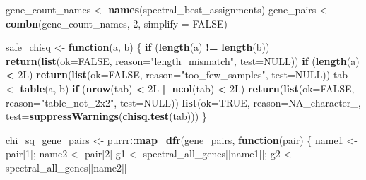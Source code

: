 \documentclass[
]{article}
\newenvironment{Shaded}{\begin{snugshade}}{\end{snugshade}}
\newcommand{\AttributeTok}[1]{\textcolor[rgb]{0.13,0.29,0.53}{#1}}
\newcommand{\ConstantTok}[1]{\textcolor[rgb]{0.56,0.35,0.01}{#1}}
\newcommand{\ControlFlowTok}[1]{\textcolor[rgb]{0.13,0.29,0.53}{\textbf{#1}}}
\newcommand{\DataTypeTok}[1]{\textcolor[rgb]{0.13,0.29,0.53}{#1}}
\newcommand{\DecValTok}[1]{\textcolor[rgb]{0.00,0.00,0.81}{#1}}
\newcommand{\FunctionTok}[1]{\textcolor[rgb]{0.13,0.29,0.53}{\textbf{#1}}}
\newcommand{\NormalTok}[1]{#1}
\newcommand{\OtherTok}[1]{\textcolor[rgb]{0.56,0.35,0.01}{#1}}
\newcommand{\SpecialCharTok}[1]{\textcolor[rgb]{0.81,0.36,0.00}{\textbf{#1}}}
\newcommand{\StringTok}[1]{\textcolor[rgb]{0.31,0.60,0.02}{#1}}
\begin{document}
\begin{Shaded}
\begin{Highlighting}[]
\NormalTok{gene\_count\_names }\OtherTok{\textless{}{-}} \FunctionTok{names}\NormalTok{(spectral\_best\_assignments)}
\NormalTok{gene\_pairs }\OtherTok{\textless{}{-}} \FunctionTok{combn}\NormalTok{(gene\_count\_names, }\DecValTok{2}\NormalTok{, }\AttributeTok{simplify =} \ConstantTok{FALSE}\NormalTok{)}

\NormalTok{safe\_chisq }\OtherTok{\textless{}{-}} \ControlFlowTok{function}\NormalTok{(a, b) \{}
  \ControlFlowTok{if}\NormalTok{ (}\FunctionTok{length}\NormalTok{(a) }\SpecialCharTok{!=} \FunctionTok{length}\NormalTok{(b)) }\FunctionTok{return}\NormalTok{(}\FunctionTok{list}\NormalTok{(}\AttributeTok{ok=}\ConstantTok{FALSE}\NormalTok{, }\AttributeTok{reason=}\StringTok{"length\_mismatch"}\NormalTok{, }\AttributeTok{test=}\ConstantTok{NULL}\NormalTok{))}
  \ControlFlowTok{if}\NormalTok{ (}\FunctionTok{length}\NormalTok{(a) }\SpecialCharTok{\textless{}} \DecValTok{2}\DataTypeTok{L}\NormalTok{)       }\FunctionTok{return}\NormalTok{(}\FunctionTok{list}\NormalTok{(}\AttributeTok{ok=}\ConstantTok{FALSE}\NormalTok{, }\AttributeTok{reason=}\StringTok{"too\_few\_samples"}\NormalTok{, }\AttributeTok{test=}\ConstantTok{NULL}\NormalTok{))}
\NormalTok{  tab }\OtherTok{\textless{}{-}} \FunctionTok{table}\NormalTok{(a, b)}
  \ControlFlowTok{if}\NormalTok{ (}\FunctionTok{nrow}\NormalTok{(tab) }\SpecialCharTok{\textless{}} \DecValTok{2}\DataTypeTok{L} \SpecialCharTok{||} \FunctionTok{ncol}\NormalTok{(tab) }\SpecialCharTok{\textless{}} \DecValTok{2}\DataTypeTok{L}\NormalTok{)}
    \FunctionTok{return}\NormalTok{(}\FunctionTok{list}\NormalTok{(}\AttributeTok{ok=}\ConstantTok{FALSE}\NormalTok{, }\AttributeTok{reason=}\StringTok{"table\_not\_2x2"}\NormalTok{, }\AttributeTok{test=}\ConstantTok{NULL}\NormalTok{))}
  \FunctionTok{list}\NormalTok{(}\AttributeTok{ok=}\ConstantTok{TRUE}\NormalTok{, }\AttributeTok{reason=}\ConstantTok{NA\_character\_}\NormalTok{, }\AttributeTok{test=}\FunctionTok{suppressWarnings}\NormalTok{(}\FunctionTok{chisq.test}\NormalTok{(tab)))}
\NormalTok{\}}

\NormalTok{chi\_sq\_gene\_pairs }\OtherTok{\textless{}{-}}\NormalTok{ purrr}\SpecialCharTok{::}\FunctionTok{map\_dfr}\NormalTok{(gene\_pairs, }\ControlFlowTok{function}\NormalTok{(pair) \{}
\NormalTok{  name1 }\OtherTok{\textless{}{-}}\NormalTok{ pair[}\DecValTok{1}\NormalTok{]; name2 }\OtherTok{\textless{}{-}}\NormalTok{ pair[}\DecValTok{2}\NormalTok{]}
\NormalTok{  g1 }\OtherTok{\textless{}{-}}\NormalTok{ spectral\_all\_genes[[name1]]; g2 }\OtherTok{\textless{}{-}}\NormalTok{ spectral\_all\_genes[[name2]]}


\end{Highlighting}
\end{Shaded}
\end{document}
